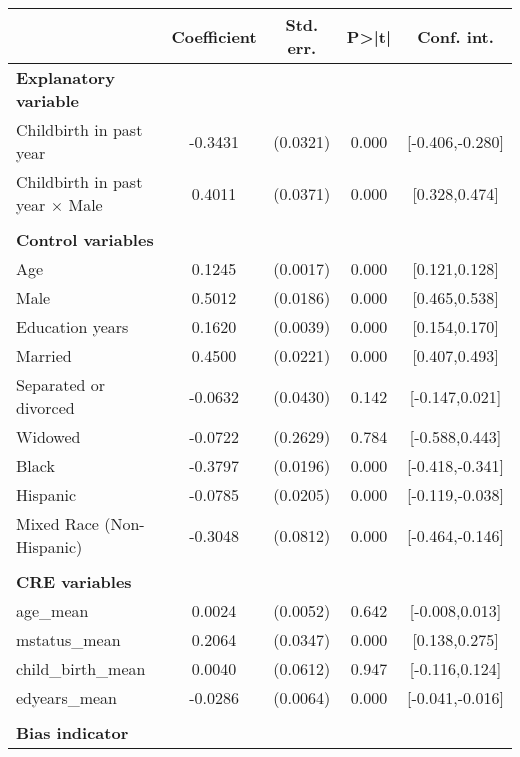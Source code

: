 {
\def\sym#1{\ifmmode^{#1}\else\(^{#1}\)\fi}
\begin{tabular}{l*{1}{cccc}}
\toprule
                    & Coefficient&   Std. err.&       P>|t|&  Conf. int.\\
\midrule
\textbf{Explanatory variable}&            &            &            &            \\
Childbirth in past year&     -0.3431&    (0.0321)&       0.000&[-0.406,-0.280]\\
Childbirth in past year $\times$ Male&      0.4011&    (0.0371)&       0.000&[0.328,0.474]\\
\\ \textbf{Control variables}&            &            &            &            \\
Age                 &      0.1245&    (0.0017)&       0.000&[0.121,0.128]\\
Male                &      0.5012&    (0.0186)&       0.000&[0.465,0.538]\\
Education years     &      0.1620&    (0.0039)&       0.000&[0.154,0.170]\\
Married             &      0.4500&    (0.0221)&       0.000&[0.407,0.493]\\
Separated or divorced&     -0.0632&    (0.0430)&       0.142&[-0.147,0.021]\\
Widowed             &     -0.0722&    (0.2629)&       0.784&[-0.588,0.443]\\
Black               &     -0.3797&    (0.0196)&       0.000&[-0.418,-0.341]\\
Hispanic            &     -0.0785&    (0.0205)&       0.000&[-0.119,-0.038]\\
Mixed Race (Non-Hispanic)&     -0.3048&    (0.0812)&       0.000&[-0.464,-0.146]\\
\\ \textbf{CRE variables}&            &            &            &            \\
age\_mean            &      0.0024&    (0.0052)&       0.642&[-0.008,0.013]\\
mstatus\_mean        &      0.2064&    (0.0347)&       0.000&[0.138,0.275]\\
child\_birth\_mean    &      0.0040&    (0.0612)&       0.947&[-0.116,0.124]\\
edyears\_mean        &     -0.0286&    (0.0064)&       0.000&[-0.041,-0.016]\\
\\ \textbf{Bias indicator}&            &            &            &            \\

\end{tabular}}

